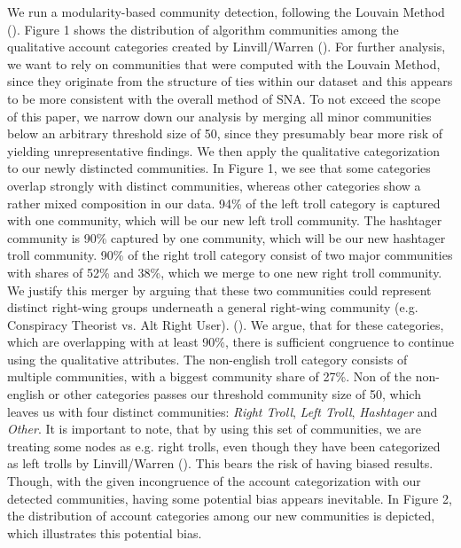 \documentclass[12pt, titlepage=true, toc=bib]{scrartcl}
\begin{document}
We run a modularity-based community detection, following the Louvain Method (\cite{blondel_fast_2008}). Figure 1 shows the distribution of algorithm communities among the qualitative account categories created by Linvill/Warren (\cite*{linvill_troll_2018}). For further analysis, we want to rely on communities that were computed with the Louvain Method, since they originate from the structure of ties within our dataset and this appears to be more consistent with the overall method of SNA. To not exceed the scope of this paper, we narrow down our analysis by merging all minor communities below an arbitrary threshold size of 50, since they presumably bear more risk of yielding unrepresentative findings. We then apply the qualitative categorization to our newly distincted communities. In Figure 1, we see that some categories overlap strongly with distinct communities, whereas other categories show a rather mixed composition in our data. 94\% of the left troll category is captured with one community, which will be our new left troll community. The hashtager community is 90\% captured by one community, which will be our new hashtager troll community. 90\% of the right troll category consist of two major communities with shares of 52\% and 38\%, which we merge to one new right troll community. We justify this merger by arguing that these two communities could represent distinct right-wing groups underneath a general right-wing community (e.g. Conspiracy Theorist vs. Alt Right User). (\cite{kaiser_unite_2018}).  We argue, that for these categories, which are overlapping with at least 90\%, there is sufficient congruence to continue using the qualitative attributes. The non-english troll category consists of multiple communities, with a biggest community share of 27\%. Non of the non-english or other categories passes our threshold community size of 50, which leaves us with four distinct communities: \textit{Right Troll}, \textit{Left Troll}, \textit{Hashtager} and \textit{Other}. It is important to note, that by using this set of communities, we are treating some nodes as e.g. right trolls, even though they have been categorized as left trolls by Linvill/Warren (\cite*{linvill_troll_2018}). This bears the risk of having biased results. Though, with the given incongruence of the account categorization with our detected communities, having some potential bias appears inevitable. In Figure 2, the distribution of account categories among our new communities is depicted, which illustrates this potential bias.
\end{document}
